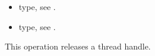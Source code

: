 \crossreferences
\begin{itemize}
	\item {} type, see .
	\item {} type, see .
\end{itemize}

%
%
\label{ompd:ompd_get_master_thread_in_parallel}
%
%
%
%
%


\label{ompd:ompd_release_thread_handle}
\summary
This operation releases a thread handle.

